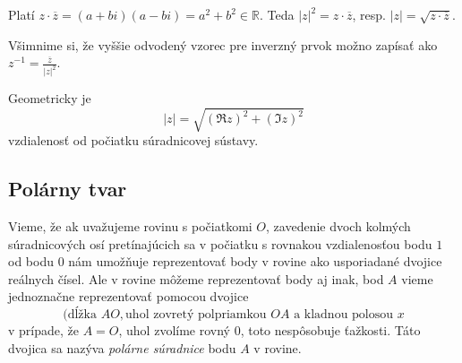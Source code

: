 \documentclass[11pt,a4paper]{article}
\theoremstyle{definition}
\theoremstyle{plain}
\theoremstyle{remark}
\newcommand{\R}{\mathbb{R}}
\begin{document}
Platí $z \cdot \overline{z} = (a+bi)(a-bi) = a^2+b^2 \in \R$. Teda $|z|^2 = z \cdot \overline{z}$, resp. $|z| = \sqrt{z \cdot \overline{z}}$.

Všimnime si, že vyššie odvodený vzorec pre inverzný prvok možno zapísať ako $z^{-1} = \frac{\overline{z}}{|z|^2}$.

Geometricky je \[
|z|=\sqrt{(\Re z)^2+(\Im z)^2}
\] vzdialenosť od počiatku súradnicovej sústavy. 

\subsection{Polárny tvar}

Vieme, že ak uvažujeme rovinu s počiatkomi $O$, zavedenie dvoch kolmých súradnicových osí pretínajúcich sa v počiatku s
rovnakou vzdialenosťou bodu $1$ od bodu $0$ nám umožňuje reprezentovať body v rovine ako usporiadané dvojice reálnych
čísel. Ale v rovine môžeme reprezentovať body aj inak, bod $A$ vieme jednoznačne reprezentovať pomocou dvojice
\[
(\text{dĺžka $AO$},\text{uhol zovretý polpriamkou $OA$ a kladnou polosou $x$}
\]
v prípade, že $A=O$, uhol zvolíme rovný $0$, toto nespôsobuje ťažkosti. Táto dvojica sa nazýva \emph{polárne súradnice}
bodu $A$ v rovine.
\end{document}
